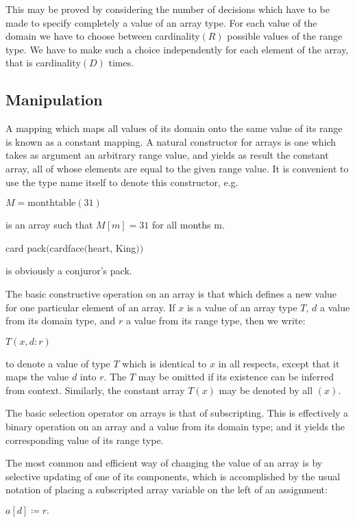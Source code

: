 \noindent
This may be proved by considering the number of decisions which have to be made to specify completely a value of an array type. For each value of the domain we have to choose between cardinality$(R)$ possible values of the range type. We have to make such a choice independently for each element of the array, that is cardinality$(D)$ times.

\subsection{Manipulation}

A mapping which maps all values of its domain onto the same value of its range is known as a constant mapping. A natural constructor for arrays is one which takes as argument an arbitrary range value, and yields as result the constant array, all of whose elements are equal to the given range value. It is convenient to use the type name itself to denote this constructor, e.g.

\quad $M = \text{monthtable}(31)$

\noindent
is an array such that $M[m] = 31$ for all months m.

\quad card pack$($cardface$($heart, King$))$

\noindent
is obviously a conjuror's pack.

The basic constructive operation on an array is that which defines a new value for one particular element of an array. If $x$ is a value of an array type $T$, $d$ a value from its domain type, and $r$ a value from its range type, then we write:

\quad $T(x, d:r)$

\noindent
to denote a value of type $T$ which is identical to $x$ in all respects, except that it maps the value $d$ into $r$. The $T$ may be omitted if its existence can be inferred from context. Similarly, the constant array $T(x)$ may be denoted by all $(x)$.

The basic selection operator on arrays is that of subscripting. This is effectively a binary operation on an array and a value from its domain type; and it yields the corresponding value of its range type.

The most common and efficient way of changing the value of an array is by selective updating of one of its components, which is accomplished by the usual notation of placing a subscripted array variable on the left of an assignment:

\quad $a[d]\coloneq r.$

